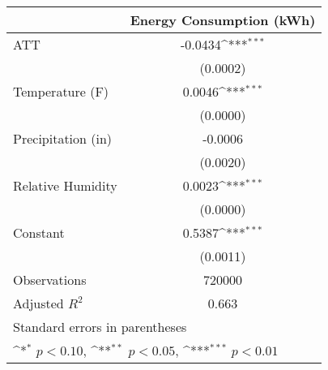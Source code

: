 {
\def\sym#1{\ifmmode^{#1}\else\(^{#1}\)\fi}
\begin{tabular}{l*{1}{c}}
\hline\hline
                    &\multicolumn{1}{c}{Energy Consumption (kWh)}\\
\hline
ATT                 &     -0.0434\sym{***}\\
                    &    (0.0002)         \\
[1em]
Temperature (F)     &      0.0046\sym{***}\\
                    &    (0.0000)         \\
[1em]
Precipitation (in)  &     -0.0006         \\
                    &    (0.0020)         \\
[1em]
Relative Humidity   &      0.0023\sym{***}\\
                    &    (0.0000)         \\
[1em]
Constant            &      0.5387\sym{***}\\
                    &    (0.0011)         \\
\hline
Observations        &      720000         \\
Adjusted \(R^{2}\)  &       0.663         \\
\hline\hline
\multicolumn{2}{l}{\footnotesize Standard errors in parentheses}\\
\multicolumn{2}{l}{\footnotesize \sym{*} \(p<0.10\), \sym{**} \(p<0.05\), \sym{***} \(p<0.01\)}\\
\end{tabular}
}
